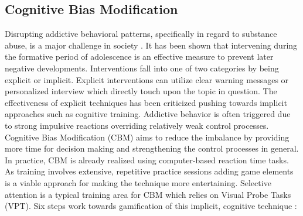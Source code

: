 \subsection{Cognitive Bias Modification}
Disrupting addictive behavioral patterns, specifically in regard to substance abuse, is a major challenge in society \cite{Boendermaker2015}.
It has been shown that intervening during the formative period of adolescence is an effective measure to prevent later negative developments.
Interventions fall into one of two categories by being explicit or implicit.
Explicit interventions can utilize clear warning messages or personalized interview which directly touch upon the topic in question.
The effectiveness of explicit techniques has been criticized pushing towards implicit approaches such as cognitive training.
Addictive behavior is often triggered due to strong impulsive reactions overriding relatively weak control processes.
Cognitive Bias Modification (CBM) aims to reduce the imbalance by providing more time for decision making and strengthening the control processes in general.
In practice, CBM is already realized using computer-based reaction time tasks.
As training involves extensive, repetitive practice sessions adding game elements is a viable approach for making the technique more entertaining.
Selective attention is a typical training area for CBM which relies on Visual Probe Tasks (VPT).
Six steps work towards gamification of this implicit, cognitive technique \cite{Boendermaker2015}:
